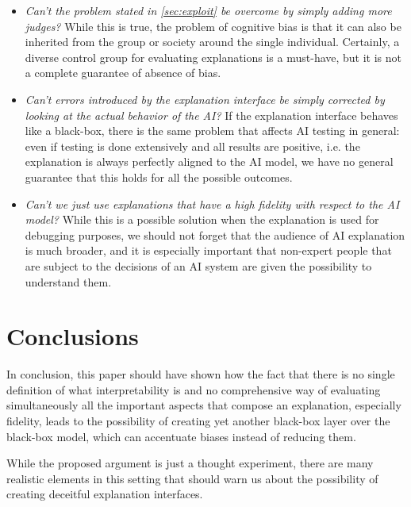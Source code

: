 \documentclass[conference]{IEEEtran}
\begin{document}
\begin{itemize}
    \item \textit{Can't the problem stated in \ref{sec:exploit} be overcome by
              simply adding more judges?} While this is true, the problem of cognitive
          bias is that it can also be inherited from the group or society around the
          single individual. Certainly, a diverse control group for evaluating
          explanations is a must-have, but it is not a complete guarantee of absence
          of bias.
    \item \textit{Can't errors introduced by the explanation interface be simply
              corrected by looking at the actual behavior of the AI?} If the explanation
          interface behaves like a black-box, there is the same problem that affects
          AI testing in general: even if testing is done extensively and all results
          are positive, i.e. the explanation is always perfectly aligned to the AI
          model, we have no general guarantee that this holds for all the possible
          outcomes.
    \item \textit{Can't we just use explanations that have a high fidelity with
              respect to the AI model?} While this is a possible solution when the
          explanation is used for debugging purposes, we should not forget that the
          audience of AI explanation is much broader, and it is especially important
          that non-expert people that are subject to the decisions of an AI system
          are given the possibility to understand them.
\end{itemize}

\section{Conclusions}
\label{sec:conclusions}

In conclusion, this paper should have shown how the fact that there is no single definition of
what interpretability is and no comprehensive way of evaluating simultaneously
all the important aspects that compose an explanation, especially fidelity,
leads to the possibility of creating yet another black-box layer over the
black-box model, which can accentuate biases instead of reducing them.

While the proposed argument is just a thought experiment, there are many
realistic elements in this setting that should warn us about the possibility of
creating deceitful explanation interfaces.

\printbibliography

% 
% 
\end{document}
